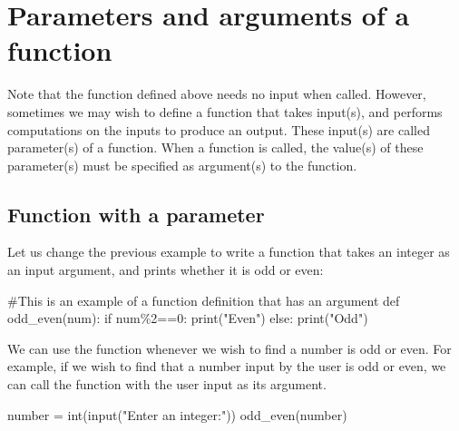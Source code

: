 \documentclass[
  letterpaper,
  DIV=11,
  numbers=noendperiod]{scrreprt}
\newenvironment{Shaded}{\begin{snugshade}}{\end{snugshade}}
\newcommand{\BuiltInTok}[1]{\textcolor[rgb]{0.00,0.23,0.31}{#1}}
\newcommand{\CommentTok}[1]{\textcolor[rgb]{0.37,0.37,0.37}{#1}}
\newcommand{\ControlFlowTok}[1]{\textcolor[rgb]{0.00,0.23,0.31}{#1}}
\newcommand{\DecValTok}[1]{\textcolor[rgb]{0.68,0.00,0.00}{#1}}
\newcommand{\KeywordTok}[1]{\textcolor[rgb]{0.00,0.23,0.31}{#1}}
\newcommand{\NormalTok}[1]{\textcolor[rgb]{0.00,0.23,0.31}{#1}}
\newcommand{\OperatorTok}[1]{\textcolor[rgb]{0.37,0.37,0.37}{#1}}
\newcommand{\StringTok}[1]{\textcolor[rgb]{0.13,0.47,0.30}{#1}}
\begin{document}
\hypertarget{parameters-and-arguments-of-a-function}{%
\section{Parameters and arguments of a
function}\label{parameters-and-arguments-of-a-function}}

Note that the function defined above needs no input when called.
However, sometimes we may wish to define a function that takes input(s),
and performs computations on the inputs to produce an output. These
input(s) are called parameter(s) of a function. When a function is
called, the value(s) of these parameter(s) must be specified as
argument(s) to the function.

\hypertarget{function-with-a-parameter}{%
\subsection{Function with a parameter}\label{function-with-a-parameter}}

Let us change the previous example to write a function that takes an
integer as an input argument, and prints whether it is odd or even:

\begin{Shaded}
\begin{Highlighting}[]
\CommentTok{\#This is an example of a function definition that has an argument}
\KeywordTok{def}\NormalTok{ odd\_even(num):           }
    \ControlFlowTok{if}\NormalTok{ num}\OperatorTok{\%}\DecValTok{2}\OperatorTok{==}\DecValTok{0}\NormalTok{:}
        \BuiltInTok{print}\NormalTok{(}\StringTok{"Even"}\NormalTok{)}
    \ControlFlowTok{else}\NormalTok{:}
        \BuiltInTok{print}\NormalTok{(}\StringTok{"Odd"}\NormalTok{)}
\end{Highlighting}
\end{Shaded}

We can use the function whenever we wish to find a number is odd or
even. For example, if we wish to find that a number input by the user is
odd or even, we can call the function with the user input as its
argument.

\begin{Shaded}
\begin{Highlighting}[]
\NormalTok{number }\OperatorTok{=} \BuiltInTok{int}\NormalTok{(}\BuiltInTok{input}\NormalTok{(}\StringTok{"Enter an integer:"}\NormalTok{))}
\NormalTok{odd\_even(number)}
\end{Highlighting}
\end{Shaded}
\end{document}
